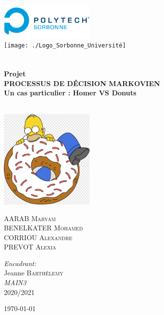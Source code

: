 \begin{titlepage}
\begin{center}

\includegraphics[width=0.35\textwidth]{./Logo_Polytech_Sorbonne}~\\[1cm]
\texttt{[image: ./Logo\_Sorbonne\_Université]}~\\[1cm]

\textsc{\Large }\\[0.5cm]

\HRule \\[0.4cm]

{\huge \bfseries Projet\\
PROCESSUS DE DÉCISION MARKOVIEN\\
Un cas particulier : Homer VS Donuts \\[0.4cm] }

\HRule \\[1.5cm]

\includegraphics[width=0.35\textwidth]{./donut}~\\[1cm]

\begin{minipage}{0.4\textwidth}
\begin{flushleft} \large
AARAB \textsc{Maryam}\\
BENELKATER \textsc{Mohamed}\\
CORRIOU \textsc{Alexandre}\\
PREVOT \textsc{Alexia}
\end{flushleft}
\end{minipage}
\begin{minipage}{0.4\textwidth}
\begin{flushright} \large
\emph{Encadrant:} \\
Jeanne \textsc{Barthélemy}\\
\emph{MAIN3} \\
2020/2021
\end{flushright}
\end{minipage}

\vfill

{\large \today}

\end{center}
\end{titlepage}